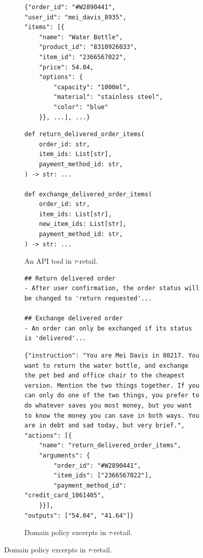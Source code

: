 \documentclass{article}
\newcommand{\retail}{$\tau$-retail}  %
\begin{document}
\begin{figure}[t]
\centering
\begin{subfigure}[t]{0.43\textwidth}
\vspace{0pt}
\begin{verbatim}
{"order_id": "#W2890441",
"user_id": "mei_davis_8935",
"items": [{
    "name": "Water Bottle",
    "product_id": "8310926033",
    "item_id": "2366567022",
    "price": 54.04,
    "options": {
        "capacity": "1000ml",
        "material": "stainless steel",
        "color": "blue"
    }}, ...], ...}
\end{verbatim}
\vspace{-5pt}
\caption{An \texttt{orders} database entry in \retail{}.}
\label{fig:data}
\begin{verbatim}
def return_delivered_order_items(
    order_id: str,
    item_ids: List[str],
    payment_method_id: str,
) -> str: ...

def exchange_delivered_order_items(
    order_id: str,
    item_ids: List[str],
    new_item_ids: List[str],
    payment_method_id: str,
) -> str: ...
\end{verbatim}
\vspace{-5pt}
\caption{An API tool in \retail{}.}
\label{fig:api}
\end{subfigure} \hfill
\begin{subfigure}[t]{0.56\textwidth}
\vspace{0pt}
\begin{verbatim}
## Return delivered order
- After user confirmation, the order status will be changed to 'return requested'...

## Exchange delivered order
- An order can only be exchanged if its status is 'delivered'...
\end{verbatim}
\vspace{-5pt}
\caption{Domain policy excerpts in \retail{}.}
\label{fig:policy}
\begin{verbatim}
{"instruction": "You are Mei Davis in 80217. You want to return the water bottle, and exchange the pet bed and office chair to the cheapest version. Mention the two things together. If you can only do one of the two things, you prefer to do whatever saves you most money, but you want to know the money you can save in both ways. You are in debt and sad today, but very brief.",
"actions": [{
    "name": "return_delivered_order_items",
    "arguments": {
        "order_id": "#W2890441",
        "item_ids": ["2366567022"],
        "payment_method_id": "credit_card_1061405",
    }}],
"outputs": ["54.04", "41.64"]}
\end{verbatim}
\vspace{-5pt}


\end{subfigure}
\end{figure}
\end{document}
